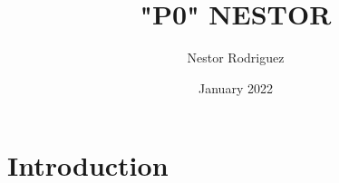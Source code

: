 \documentclass{article}
\title{"P0" NESTOR}
\author{Nestor Rodriguez }
\date{January 2022}
\begin{document}
\maketitle

\section{Introduction}
\end{document}
